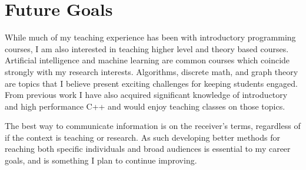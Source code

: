 \documentclass[a4paper, 11pt]{article}
\begin{document}
\section{Future Goals}
While much of my teaching experience has been with introductory
programming courses, I am also interested in teaching higher level
and theory based courses. Artificial intelligence and machine learning
are common courses which coincide strongly with my research interests.
Algorithms, discrete math, and graph theory are topics that I believe
present exciting challenges for keeping students engaged.
From previous work I have also acquired significant knowledge of
introductory and high performance C++ and would enjoy teaching classes
on those topics.

The best way to communicate information is on the receiver's
terms, regardless of if the context is teaching or research.
As such developing better methods for reaching both specific
individuals and broad audiences is essential to my career goals,
and is something I plan to continue improving.
\end{document}
